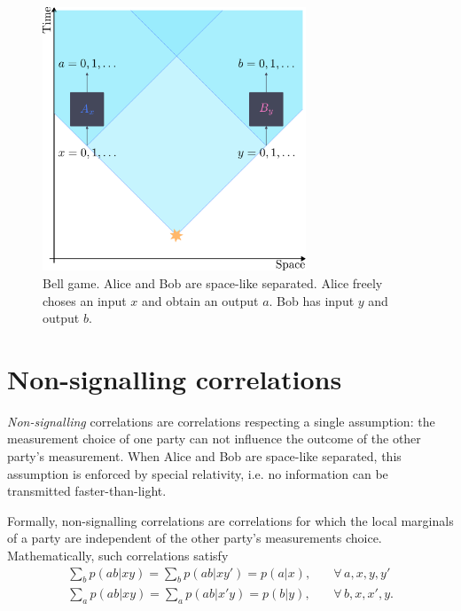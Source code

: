 \begin{figure}
	\begin{center}
		\includegraphics[width=0.7\textwidth]{chapters/overview/img/belltest.pdf}
	\end{center}
	\caption{Bell game. Alice and Bob are space-like separated. Alice freely choses an input $x$ and obtain an output $a$. Bob has input $y$ and output $b$.}
	\label{fig:belltest}
\end{figure}



\section{Non-signalling correlations}

\textit{Non-signalling} correlations are correlations respecting a single assumption: the measurement choice of one party can not influence the outcome of the other party's measurement.
When Alice and Bob are space-like separated, this assumption is enforced by special relativity, i.e. no information can be transmitted faster-than-light.

Formally, non-signalling correlations are correlations for which the local marginals of a party are independent of the other party's measurements choice. 
Mathematically, such correlations satisfy
\begin{align}
	\sum_b p(ab|xy) = \sum_b p(ab|xy') = p(a|x), \quad &\forall\,a,x,y,y' \\
	\sum_a p(ab|xy) = \sum_a p(ab|x'y) = p(b|y), \quad &\forall\,b,x,x',y.
	\label{eq:non-signalling}
\end{align}


